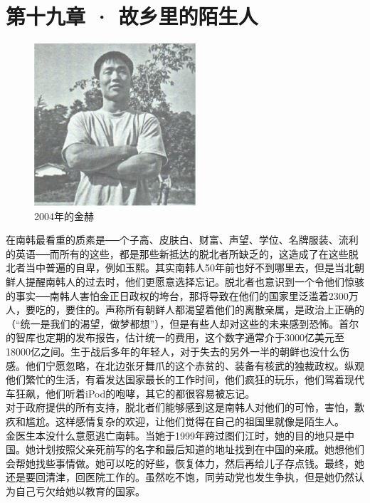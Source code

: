 \fancyhead[RO]{\thepage}
\fancyhead[LE]{\thepage}
\fancyfoot[LE,RO]{}
\fancyfoot[LO,CE]{}
\fancyfoot[CO,RE]{}
\chapter*{第十九章 · 故乡里的陌生人}
\begin{figure}[!htbp]
\centering
\includegraphics[width=6cm]{./Chapters/Images/19.jpg}
\caption*{2004年的金赫}
\end{figure}


在南韩最看重的质素是──个子高、皮肤白、财富、声望、学位、名牌服装、流利的英语──而所有的这些，都是那些新抵达的脱北者所缺乏的，这造成了在这些脱北者当中普遍的自卑，例如玉熙。其实南韩人50年前也好不到哪里去，但是当北朝鲜人提醒南韩人的过去时，他们更愿意选择忘记。脱北者也意识到一个令他们惊骇的事实──南韩人害怕金正日政权的垮台，那将导致在他们的国家里泛滥着2300万人，要吃的，要住的。声称所有朝鲜人都渴望着他们的离散亲属，是政治上正确的（“统一是我们的渴望，做梦都想”），但是有些人却对这些的未来感到恐怖。首尔的智库也定期的发布报告，估计统一的费用，这个数字通常介于3000亿美元至18000亿之间。生于战后多年的年轻人，对于失去的另外一半的朝鲜也没什么伤感。他们宁愿忽略，在北边张牙舞爪的这个赤贫的、装备有核武的独裁政权。纵观他们繁忙的生活，有着发达国家最长的工作时间，他们疯狂的玩乐，他们驾着现代车狂飙，他们听着iPod的咆哮，其它的都很容易被忘记。\\

对于政府提供的所有支持，脱北者们能够感到这是南韩人对他们的可怜，害怕，歉疚和尴尬。这样感情复杂的欢迎，让他们觉得在自己的祖国里就像是陌生人。\\

金医生本没什么意愿逃亡南韩。当她于1999年跨过图们江时，她的目的地只是中国。她计划按照父亲死前写的名字和最后知道的地址找到在中国的亲戚。她想他们会帮她找些事情做。她可以吃的好些，恢复体力，然后再给儿子存点钱。最终，她还是要回清津，回医院工作的。虽然吃不饱，同劳动党也发生争执，但是她仍然认为自己亏欠给她以教育的国家。\\

